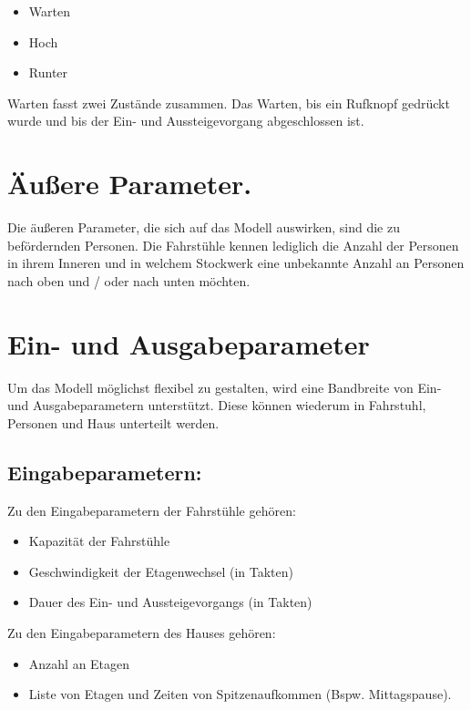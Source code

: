 \documentclass[
]{book}
\providecommand{\tightlist}{%
  \setlength{\itemsep}{0pt}\setlength{\parskip}{0pt}}
\begin{document}
\begin{itemize}
\tightlist
\item
  Warten
\item
  Hoch
\item
  Runter
\end{itemize}

Warten fasst zwei Zustände zusammen. Das Warten, bis ein Rufknopf
gedrückt wurde und bis der Ein- und Aussteigevorgang abgeschlossen ist.

\hypertarget{uxe4uuxdfere-parameter.}{%
\section{Äußere Parameter.}\label{uxe4uuxdfere-parameter.}}

Die äußeren Parameter, die sich auf das Modell auswirken, sind die zu
befördernden Personen. Die Fahrstühle kennen lediglich die Anzahl der
Personen in ihrem Inneren und in welchem Stockwerk eine unbekannte
Anzahl an Personen nach oben und / oder nach unten möchten.

\hypertarget{ein--und-ausgabeparameter}{%
\section{Ein- und Ausgabeparameter}\label{ein--und-ausgabeparameter}}

Um das Modell möglichst flexibel zu gestalten, wird eine Bandbreite von
Ein- und Ausgabeparametern unterstützt. Diese können wiederum in
Fahrstuhl, Personen und Haus unterteilt werden.

\hypertarget{eingabeparametern}{%
\subsection{Eingabeparametern:}\label{eingabeparametern}}

Zu den Eingabeparametern der Fahrstühle gehören:

\begin{itemize}
\tightlist
\item
  Kapazität der Fahrstühle
\item
  Geschwindigkeit der Etagenwechsel (in Takten)
\item
  Dauer des Ein- und Aussteigevorgangs (in Takten)
\end{itemize}

Zu den Eingabeparametern des Hauses gehören:

\begin{itemize}
\tightlist
\item
  Anzahl an Etagen
\item
  Liste von Etagen und Zeiten von Spitzenaufkommen (Bspw. Mittagspause).
\end{itemize}
\end{document}
